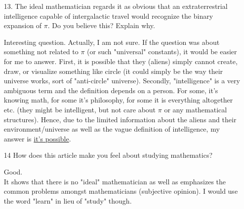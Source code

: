 \documentclass[12pt, a4paper]{article}                  %
\begin{document}
\begin{enumerate}
\item[13.]
The ideal mathematician regards it as obvious that an extraterrestrial intelligence
capable of intergalactic travel would recognize the binary expansion of $\pi$.
Do you believe this? Explain why.

Interesting question. Actually, I am not sure. If the question was about something not
related to $\pi$ (or such "universal" constants), it would be easier for me to answer.
First, it is possible that they (aliens) simply cannot create, draw, or visualize something like circle 
(it could simply be the way their universe works, sort of "anti-circle" universe).
Secondly, "intelligence" is a very ambiguous term and the definition depends on a person. For some, it's knowing math,
for some it's philosophy, for some it is everything altogether etc. (they might be intelligent, but not care about $\pi$ or any mathematical structures).
Hence, due to the limited information about the aliens and their environment/universe as well as the vague definition of intelligence, my answer is
\underline{it's possible}.

\item[14]
How does this article make you feel about studying mathematics?

Good.\\
It shows that there is no "ideal" mathematician as well as
emphasizes the common problems amongst mathematicians (subjective opinion).
I would use the word "learn" in lieu of "study" though.
\end{enumerate}
\end{document}
